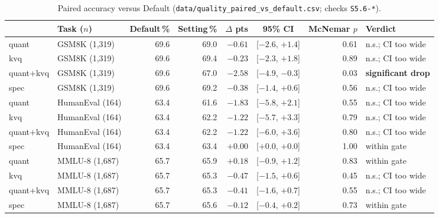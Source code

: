 \documentclass[10pt,a4paper]{article}
\newcommand{\hc}[1]{{\leavevmode\bfseries\color{ink}#1}}   %
\newcommand{\fp}[1]{{\leavevmode\urlstyle{tt}\color{codecol}\nolinkurl{#1}}}
\begin{document}
\begin{table}[H]
\small
\setlength{\tabcolsep}{4pt}
{
\begin{tabularx}{\linewidth}{@{}llrrrcrL@{}}
\toprule
\rowcolor{tblhead}\hc{Setting} & \hc{Task ($n$)} & \hc{Default\,\%} & \hc{Setting\,\%} & \hc{$\Delta$ pts} & \hc{95\% CI} & \hc{McNemar $p$} & \hc{Verdict} \\
\midrule
quant & GSM8K (1,319) & 69.6 & 69.0 & $-0.61$ & [$-2.6$, $+1.4$] & 0.61 & n.s.; CI too wide \\
kvq & GSM8K (1,319) & 69.6 & 69.4 & $-0.23$ & [$-2.3$, $+1.8$] & 0.89 & n.s.; CI too wide \\
 quant+kvq & GSM8K (1,319) & 69.6 & 67.0 & $\mathbf{-2.58}$ & [$-4.9$, $-0.3$] & 0.03 & \textbf{significant drop} \\
spec & GSM8K (1,319) & 69.6 & 69.2 & $-0.38$ & [$-1.4$, $+0.6$] & 0.56 & n.s.; CI too wide \\
quant & HumanEval (164) & 63.4 & 61.6 & $-1.83$ & [$-5.8$, $+2.1$] & 0.55 & n.s.; CI too wide \\
kvq & HumanEval (164) & 63.4 & 62.2 & $-1.22$ & [$-5.7$, $+3.3$] & 0.79 & n.s.; CI too wide \\
quant+kvq & HumanEval (164) & 63.4 & 62.2 & $-1.22$ & [$-6.0$, $+3.6$] & 0.80 & n.s.; CI too wide \\
spec & HumanEval (164) & 63.4 & 63.4 & $+0.00$ & [$+0.0$, $+0.0$] & 1.00 & within gate \\
quant & MMLU-8 (1,687) & 65.7 & 65.9 & $+0.18$ & [$-0.9$, $+1.2$] & 0.83 & within gate \\
kvq & MMLU-8 (1,687) & 65.7 & 65.3 & $-0.47$ & [$-1.5$, $+0.6$] & 0.45 & n.s.; CI too wide \\
quant+kvq & MMLU-8 (1,687) & 65.7 & 65.3 & $-0.41$ & [$-1.6$, $+0.7$] & 0.55 & n.s.; CI too wide \\
spec & MMLU-8 (1,687) & 65.7 & 65.6 & $-0.12$ & [$-0.4$, $+0.2$] & 0.73 & within gate \\
\bottomrule
\end{tabularx}}
\caption{Paired accuracy versus Default (\fp{data/quality_paired_vs_default.csv}; checks \texttt{S5.6-*}).}
\end{table}
\end{document}
